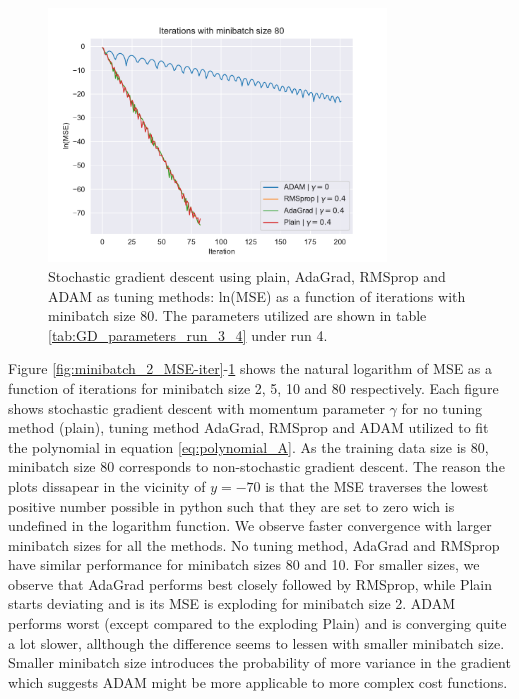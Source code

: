 \begin{figure}[H]
\centering
\includegraphics[width=0.8\textwidth]{Figures/PartA/minibatch_80_MSE(iter).pdf}
\caption{Stochastic gradient descent using plain, AdaGrad, RMSprop and ADAM as tuning methods: ln(MSE) as a function of iterations with minibatch size 80.
 The parameters utilized are shown in table \ref{tab:GD_parameters_run_3_4} under run 4.}
\label{fig:minibatch_80_MSE-iter}
\end{figure}

Figure \ref{fig:minibatch_2_MSE-iter}-\ref{fig:minibatch_80_MSE-iter} shows the natural logarithm of MSE as a function of iterations
for minibatch size 2, 5, 10 and 80 respectively. Each figure shows stochastic gradient descent with momentum parameter $\gamma $ for no tuning method (plain),
tuning method AdaGrad, RMSprop and ADAM utilized to fit the polynomial in equation \ref{eq:polynomial_A}. As the training data 
size is 80, minibatch size 80 corresponds to non-stochastic gradient descent. The reason the plots dissapear in the vicinity of $y=-70$ 
is that the MSE traverses the lowest positive number possible in python such that they are set to zero wich is undefined in the logarithm function. 
We observe faster convergence with larger minibatch sizes for all the methods. No tuning method, AdaGrad and RMSprop have similar performance for minibatch 
sizes 80 and 10. For smaller sizes, we observe that AdaGrad performs best closely followed by RMSprop, while Plain starts deviating and is its MSE is 
exploding for minibatch size 2. ADAM performs worst (except compared to the exploding Plain) and is converging quite a lot slower, allthough the difference 
seems to lessen with smaller minibatch size. Smaller minibatch size introduces the probability of more variance in the gradient which suggests ADAM might be more 
applicable to more complex cost functions.    

